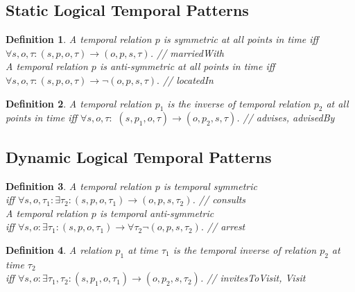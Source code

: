 \documentclass[letterpaper]{article} %
\newtheorem{definition}{Definition}
\begin{document}
\subsection{\textbf{Static Logical Temporal Patterns}}
\begin{definition}
\label{temporalsym}
A temporal relation $p$ is symmetric at all points in time iff $\forall s,o,\tau:(s,p,o,\tau) \rightarrow (o,p,s,\tau)$. \hfill // marriedWith \\
A temporal relation $p$ is anti-symmetric at all points in time iff
$\forall s,o,\tau:(s,p,o,\tau) \rightarrow \neg (o,p,s,\tau). $ \hfill // locatedIn
\end{definition}
\begin{definition}
A temporal relation $p_1$ is the inverse of temporal relation $p_2$ at all points in time
iff $\forall s,o,\tau:$
$(s,p_1,o,\tau) \rightarrow (o,p_2,s,\tau)$. \hfill // advises, advisedBy
\label{temporalinv}
\end{definition}

\subsection{\textbf{Dynamic Logical Temporal Patterns}}
\begin{definition}
\label{dynamicsym}
A temporal relation $p$ is temporal symmetric \\ iff $\forall s,o, \tau_1: \exists\tau_2:(s,p,o,\tau_{1}) \rightarrow (o,p,s,\tau_{2})$. \hfill // consults \\
A temporal relation $p$ is temporal anti-symmetric\\ iff
$\forall s,o: \exists\tau_1:(s,p,o,\tau_{1}) \rightarrow \forall \tau_2 \neg (o,p,s,\tau_{2}). $ \hfill // arrest
\end{definition}

\begin{definition}
A relation $p_1$ at time $\tau_1$ is the temporal inverse of relation $p_2$ at time $\tau_2$ \\ iff $\forall s,o: \exists\tau_1,\tau_2: (s,p_1,o,\tau_1) \rightarrow (o,p_2,s,\tau_2)$. \hfill // invitesToVisit, Visit
\label{delayedtemporalinv}
\end{definition}

\end{document}
